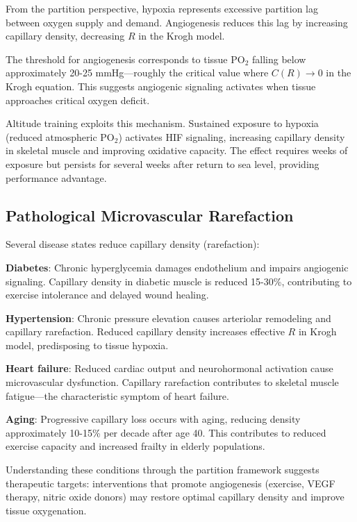\documentclass[10pt,twocolumn,a4paper]{article}
\theoremstyle{remark}
\begin{document}
From the partition perspective, hypoxia represents excessive partition lag between oxygen supply and demand. Angiogenesis reduces this lag by increasing capillary density, decreasing $R$ in the Krogh model.

The threshold for angiogenesis corresponds to tissue PO$_{2}$ falling below approximately 20-25 mmHg—roughly the critical value where $C(R) \to 0$ in the Krogh equation. This suggests angiogenic signaling activates when tissue approaches critical oxygen deficit.

Altitude training exploits this mechanism. Sustained exposure to hypoxia (reduced atmospheric PO$_{2}$) activates HIF signaling, increasing capillary density in skeletal muscle and improving oxidative capacity. The effect requires weeks of exposure but persists for several weeks after return to sea level, providing performance advantage.

\subsection{Pathological Microvascular Rarefaction}

Several disease states reduce capillary density (rarefaction):

\textbf{Diabetes}: Chronic hyperglycemia damages endothelium and impairs angiogenic signaling. Capillary density in diabetic muscle is reduced 15-30\%, contributing to exercise intolerance and delayed wound healing.

\textbf{Hypertension}: Chronic pressure elevation causes arteriolar remodeling and capillary rarefaction. Reduced capillary density increases effective $R$ in Krogh model, predisposing to tissue hypoxia.

\textbf{Heart failure}: Reduced cardiac output and neurohormonal activation cause microvascular dysfunction. Capillary rarefaction contributes to skeletal muscle fatigue—the characteristic symptom of heart failure.

\textbf{Aging}: Progressive capillary loss occurs with aging, reducing density approximately 10-15\% per decade after age 40. This contributes to reduced exercise capacity and increased frailty in elderly populations.

Understanding these conditions through the partition framework suggests therapeutic targets: interventions that promote angiogenesis (exercise, VEGF therapy, nitric oxide donors) may restore optimal capillary density and improve tissue oxygenation.
\end{document}
